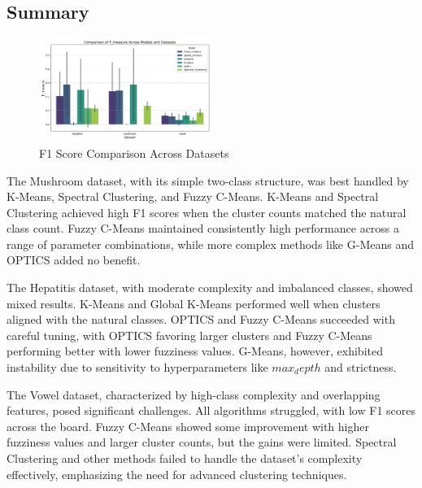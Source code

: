 \subsection{Summary}
\label{subsec:resultssummary}

\begin{figure}[h!]
    \centering
    \includegraphics[width=0.5\textwidth]{figures/model_comparison_f_measure.png}
    \caption{F1 Score Comparison Across Datasets}
    \label{fig:model_comparison_f_measure}
\end{figure}

The Mushroom dataset, with its simple two-class structure, was best handled by K-Means,
Spectral Clustering, and Fuzzy C-Means. K-Means and Spectral Clustering achieved high F1 
scores when the cluster counts matched the natural class count. Fuzzy C-Means maintained
consistently high performance across a range of parameter combinations, while more complex 
methods like G-Means and OPTICS added no benefit.

The Hepatitis dataset, with moderate complexity and imbalanced classes, showed mixed results.
K-Means and Global K-Means performed well when clusters aligned with the natural classes. 
OPTICS and Fuzzy C-Means succeeded with careful tuning, with OPTICS favoring larger clusters and Fuzzy C-Means performing better with lower fuzziness values.
G-Means, however, exhibited instability due to sensitivity to hyperparameters like $max_depth$ and strictness.

The Vowel dataset, characterized by high-class complexity and overlapping 
features, posed significant challenges. All algorithms struggled, with low F1 
scores across the board. Fuzzy C-Means showed some improvement with higher fuzziness 
values and larger cluster counts, but the gains were limited. Spectral Clustering 
and other methods failed to handle the dataset's complexity effectively, emphasizing the need for advanced clustering techniques.